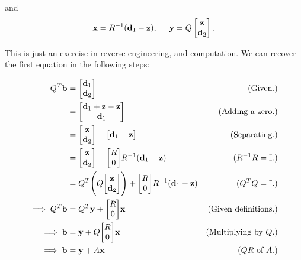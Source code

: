 and
\[
\textbf{x} = R^{-1}(\textbf{d}_1 - \textbf{z}), \hspace{5mm }\textbf{y} = Q\begin{bmatrix}\textbf{z}\\\textbf{d}_2\end{bmatrix}.
\]
\partbreak
\begin{solution}

    This is just an exercise in reverse engineering, and computation. We can recover the first equation in the following steps:

    \alignbreak
    \begin{align*}
        Q^T\textbf{b} &= \mqty[\textbf{d}_1\\\textbf{d}_2] &\text{(Given.)}\\
        &= \mqty[\textbf{d}_1 + \textbf{z} - \textbf{z}\\\textbf{d}_1] &\text{(Adding a zero.)}\\
        &= \mqty[\textbf{z}\\\textbf{d}_2] + \mqty[\textbf{d}_1 - \textbf{z}] &\text{(Separating.)}\\
        &= \mqty[\textbf{z}\\\textbf{d}_2] + \mqty[R\\0] R^\inv(\textbf{d}_1 - \textbf{z}) &(R^\inv R = \id.)\\
        &= Q^T\Bigg(Q\mqty[\textbf{z}\\\textbf{d}_2]\Bigg) + \mqty[R\\0] R^\inv(\textbf{d}_1 - \textbf{z}) &(Q^TQ = \id.)\\
        \implies Q^T\textbf{b} &= Q^T\textbf{y} + \mqty[R\\0]\textbf{x} &\text{(Given definitions.)}\\
        \implies \textbf{b} &= \textbf{y} + Q\mqty[R\\0] \textbf{x} &\text{(Multiplying by $Q$.)}\\
        \implies \textbf{b} &= \textbf{y} + A\textbf{x} &\text{($QR$ of $A$.)}
    \end{align*}
    \alignbreak


\end{solution}
